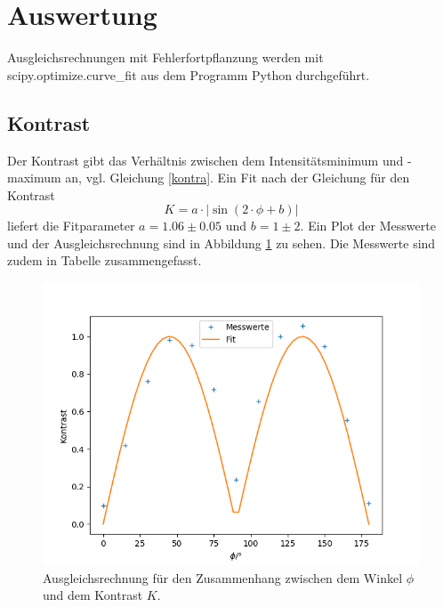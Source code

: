 \section{Auswertung}

Ausgleichsrechnungen mit Fehlerfortpflanzung werden mit scipy.optimize.curve\_fit \cite{scipy}
aus dem Programm Python durchgeführt.

\subsection{Kontrast}

Der Kontrast gibt das Verhältnis zwischen dem Intensitätsminimum und -maximum an, vgl. Gleichung
\ref{kontra}. Ein Fit nach der Gleichung für den Kontrast
\[
K = a \cdot | \sin (2 \cdot \phi + b) |
\]
liefert die Fitparameter $a = 1.06 \pm 0.05$ und $b = 1 \pm 2$. Ein Plot der Messwerte und der
Ausgleichsrechnung sind in Abbildung \ref{kontrast} zu sehen. Die Messwerte sind zudem in Tabelle
zusammengefasst.

\begin{figure}[h]
\centering
\includegraphics[width=\linewidth]{img/kontrast.png}
\caption{Ausgleichsrechnung für den Zusammenhang zwischen dem Winkel $\phi$ und dem Kontrast $K$.}
\label{kontrast}
\end{figure}

